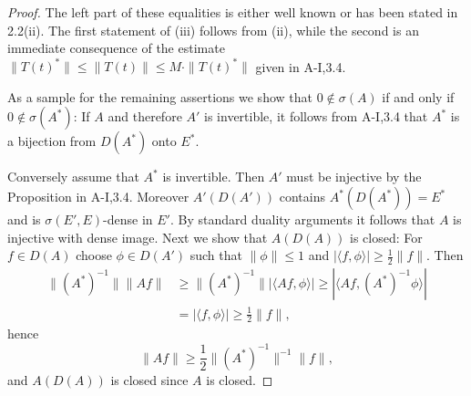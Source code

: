 \begin{proof}
The left part of these equalities is either well known or has been stated in 
2.2(ii).
The first statement of (iii) follows from (ii), while the second is an immediate consequence of the estimate $\|T(t)^{*}\| \leq \|T(t)\| \leq M\cdot\|T(t)^{*}\|$ given in A-I,3.4.

As a sample for the remaining assertions we show that $0 \notin \sigma(A)$ if and only if $0 \notin \sigma(A^{*})$:
If $A$ and therefore $A'$ is invertible, it follows from A-I,3.4 that $A^{*}$ is a bijection from $D(A^{*})$ onto $E^{*}$.

Conversely assume that $A^{*}$ is invertible.
Then $A'$ must be injective by the Proposition in A-I,3.4.
Moreover $A'(D(A'))$ contains $A^{*}(D(A^{*})) = E^{*}$ and is $\sigma(E',E)$-dense in $E'$.
By standard duality arguments it follows that $A$ is injective with dense image.
Next we show that $A(D(A))$ is closed: For $f \in D(A)$ choose $\phi \in D(A')$ such that $\|\phi\| \leq 1$ and $|\langle f,\phi \rangle| \geq \frac{1}{2}\|f\|$.
Then
\begin{align*}
\|(A^{*})^{-1}\| \|Af\| &\geq \|(A^{*})^{-1}\| |\langle Af,\phi \rangle| \geq |\langle Af,(A^{*})^{-1}\phi \rangle| \\
&= |\langle f,\phi \rangle| \geq \frac{1}{2}\|f\| ,
\end{align*}
hence
\[
\|Af\| \geq \frac{1}{2}\|(A^{*})^{-1}\|^{-1}\|f\| ,
\]
and $A(D(A))$ is closed since $A$ is closed.
\end{proof}
